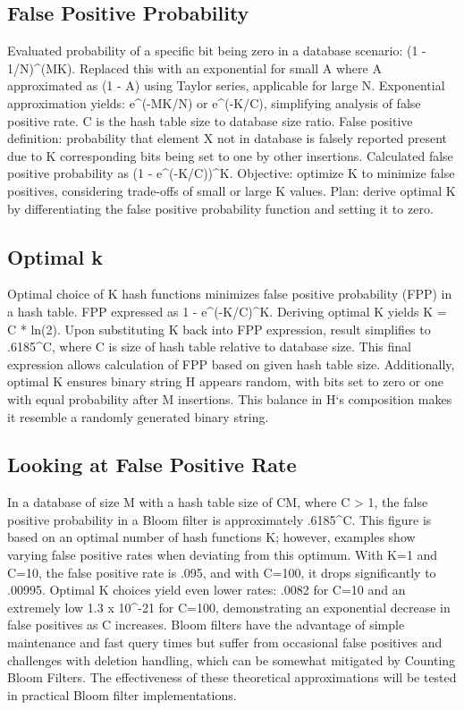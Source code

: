 \subsection*{False Positive Probability}
Evaluated probability of a specific bit being zero in a database scenario: (1 - 1/N)\textasciicircum{}(MK).
Replaced this with an exponential for small A where A approximated as (1 - A) using Taylor series, applicable for large N\@.
Exponential approximation yields: e\textasciicircum{}(-MK/N) or e\textasciicircum{}(-K/C), simplifying analysis of false positive rate.
C is the hash table size to database size ratio.
False positive definition: probability that element X not in database is falsely reported present due to K corresponding bits being set to one by other insertions.
Calculated false positive probability as (1 - e\textasciicircum{}(-K/C))\textasciicircum{}K\@.
Objective: optimize K to minimize false positives, considering trade-offs of small or large K values.
Plan: derive optimal K by differentiating the false positive probability function and setting it to zero.

\subsection*{Optimal k}
Optimal choice of K hash functions minimizes false positive probability (FPP) in a hash table.
FPP expressed as 1 - e\textasciicircum{}(-K/C)\textasciicircum{}K\@.
Deriving optimal K yields K = C * ln(2).
Upon substituting K back into FPP expression, result simplifies to .6185\textasciicircum{}C, where C is size of hash table relative to database size.
This final expression allows calculation of FPP based on given hash table size.
Additionally, optimal K ensures binary string H appears random, with bits set to zero or one with equal probability after M insertions.
This balance in H`s composition makes it resemble a randomly generated binary string.

\subsection*{Looking at False Positive Rate}
In a database of size M with a hash table size of CM, where C \textgreater{} 1, the false positive probability in a Bloom filter is approximately .6185\textasciicircum{}C\@.
This figure is based on an optimal number of hash functions K; however, examples show varying false positive rates when deviating from this optimum.
With K=1 and C=10, the false positive rate is .095, and with C=100, it drops significantly to .00995.
Optimal K choices yield even lower rates: .0082 for C=10 and an extremely low 1.3 x 10\textasciicircum{}-21 for C=100, demonstrating an exponential decrease in false positives as C increases.
Bloom filters have the advantage of simple maintenance and fast query times but suffer from occasional false positives and challenges with deletion handling, which can be somewhat mitigated by Counting Bloom Filters.
The effectiveness of these theoretical approximations will be tested in practical Bloom filter implementations.

